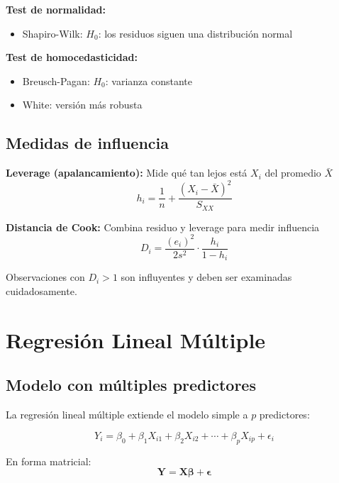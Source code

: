 \documentclass[11pt,a4paper]{article}
\begin{document}
\textbf{Test de normalidad:}
\begin{itemize}
    \item Shapiro-Wilk: $H_0$: los residuos siguen una distribución normal
\end{itemize}

\textbf{Test de homocedasticidad:}
\begin{itemize}
    \item Breusch-Pagan: $H_0$: varianza constante
    \item White: versión más robusta
\end{itemize}

\subsection{Medidas de influencia}

\textbf{Leverage (apalancamiento):} Mide qué tan lejos está $X_i$ del promedio $\bar{X}$
\begin{equation}
h_i = \frac{1}{n} + \frac{(X_i - \bar{X})^2}{S_{XX}}
\end{equation}

\textbf{Distancia de Cook:} Combina residuo y leverage para medir influencia
\begin{equation}
D_i = \frac{(e_i)^2}{2s^2} \cdot \frac{h_i}{1 - h_i}
\end{equation}

Observaciones con $D_i > 1$ son influyentes y deben ser examinadas cuidadosamente.

\section{Regresión Lineal Múltiple}

\subsection{Modelo con múltiples predictores}

La regresión lineal múltiple extiende el modelo simple a $p$ predictores:

\begin{equation}
Y_i = \beta_0 + \beta_1 X_{i1} + \beta_2 X_{i2} + \cdots + \beta_p X_{ip} + \epsilon_i
\end{equation}

En forma matricial:
\begin{equation}
\mathbf{Y} = \mathbf{X} \boldsymbol{\beta} + \boldsymbol{\epsilon}
\end{equation}
\end{document}
